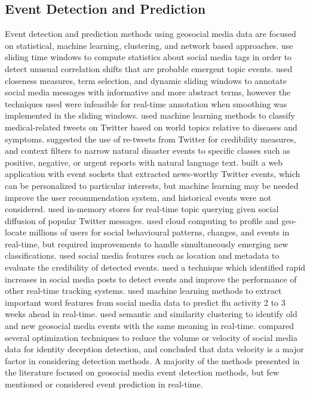 \subsection{Event Detection and Prediction} \label{event-detection}

 Event detection and prediction methods using geosocial media data are focused on statistical, machine learning, clustering, and network based approaches. \cite{Alvanaki:2012} use sliding time windows to compute statistics about social media tags in order to detect unusual correlation shifts that are probable emergent topic events. \cite{Khabiri:2012} used closeness measures, term selection, and dynamic sliding windows to annotate social media messages with informative and more abstract terms, however the techniques used were infeasible for real-time annotation when smoothing was implemented in the sliding windows. \cite{Sofean:2012} used machine learning methods to classify medical-related tweets on Twitter based on world topics relative to diseases and symptoms. \cite{Middleton:2014} suggested the use of re-tweets from Twitter for credibility measures, and context filters to narrow natural disaster events to specific classes such as positive, negative, or urgent reports with natural language text. \cite{Hazra:2015} built a web application with event sockets that extracted news-worthy Twitter events, which can be personalized to particular interests, but machine learning may be needed improve the user recommendation system, and historical events were not considered. \cite{Enoki:2015} used in-memory stores for real-time topic querying given social diffusion of popular Twitter messages. \cite{Abrol:2015} used cloud computing to profile and geo-locate millions of users for social behavioural patterns, changes, and events in real-time, but required improvements to handle simultaneously emerging new classifications. \cite{Buntain:2015} used social media features such as location and metadata to evaluate the credibility of detected events. \cite{Buntain:2016} used a technique which identified rapid increases in social media posts to detect events and improve the performance of other real-time tracking systems. \cite{Lee:2017} used machine learning methods to extract important word features from social media data to predict flu activity 2 to 3 weeks ahead in real-time. \cite{Li:2017} used semantic and similarity clustering to identify old and new geosocial media events with the same meaning in real-time. \cite{Tsikerdekis:2017} compared several optimization techniques to reduce the volume or velocity of social media data for identity deception detection, and concluded that data velocity is a major factor in considering detection methods. A majority of the methods presented in the literature focused on geosocial media event detection methods, but few mentioned or considered event prediction in real-time.

